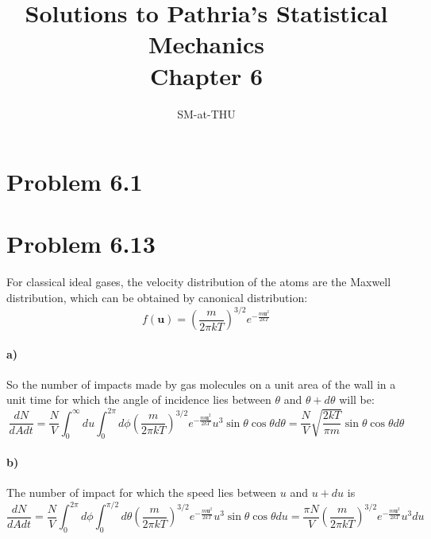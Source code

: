 \documentclass{article}
\author{SM-at-THU}
\title{\bf{Solutions to Pathria's Statistical Mechanics}\\Chapter 6}
\begin{document}
\maketitle
\section*{Problem 6.1}

\section*{Problem 6.13}
For classical ideal gases, the velocity distribution of the atoms are the Maxwell distribution, which can be obtained by canonical distribution:
\begin{equation}
f(\mathbf{u}) = \left(\frac{m}{2\pi kT}\right)^{3/2}e^{-\frac{m\mathbf{u}^2}{2kT}}
\end{equation}
\paragraph{a)}
So the number of impacts made by gas molecules on a unit area of the wall in a unit time for which the angle of incidence lies between $\theta$ and $\theta + d\theta$ will be:
\begin{equation}
\frac{dN}{dAdt} = \frac{N}{V}\int_0^\infty du\int_0^{2\pi} d\phi \left(\frac{m}{2\pi kT}\right)^{3/2}e^{-\frac{m\mathbf{u}^2}{2kT}}u^3\sin{\theta} \cos{\theta}d\theta=\frac{N}{V}\sqrt{\frac{2kT}{\pi m}}\sin\theta\cos\theta d\theta
\end{equation}
\paragraph{b)}The number of impact for which the speed lies between $u$ and $u + du$ is
\begin{equation}
\frac{dN}{dAdt} = \frac{N}{V}\int_0^{2\pi}d\phi \int_0^{\pi/2}d\theta \left(\frac{m}{2\pi kT}\right)^{3/2}e^{-\frac{m\mathbf{u}^2}{2kT}}u^3\sin{\theta} \cos{\theta}du=\frac{\pi N}{V} \left(\frac{m}{2\pi kT}\right)^{3/2}e^{-\frac{m\mathbf{u}^2}{2kT}}u^3 du
\end{equation}
\end{document}
